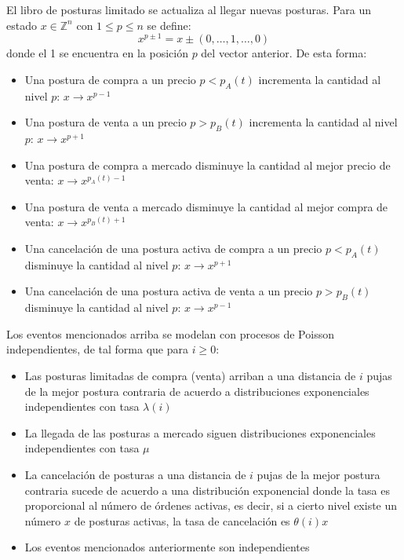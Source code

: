 \documentclass[11pt]{article}
\numberwithin{equation}{section} %
\begin{document}
El libro de posturas limitado se actualiza al llegar nuevas posturas. Para un estado $x \in \mathbb{Z}^n$ con $1\leq p \leq n$ se define:
\[
x^{p\pm 1}=x \pm (0,\ldots,1,\ldots,0)
\]
donde el 1 se encuentra en la posición $p$ del vector anterior. De esta forma:
\begin{itemize}
\item Una postura de compra a un precio $p<p_A(t)$ incrementa la cantidad al nivel $p$: $x\rightarrow x^{p-1}$
\item Una postura de venta a un precio $p>p_B(t)$ incrementa la cantidad al nivel $p$: $x\rightarrow x^{p+1}$
\item Una postura de compra a mercado disminuye la cantidad al mejor precio de venta: $x\rightarrow x^{p_A(t)-1}$
\item Una postura de venta a mercado disminuye la cantidad al mejor compra de venta: $x\rightarrow x^{p_B(t)+1}$
\item Una cancelación de una postura activa de compra a un precio $p<p_A(t)$ disminuye la cantidad al nivel $p$: $x\rightarrow x^{p+1}$
\item Una cancelación de una postura activa de venta a un precio $p>p_B(t)$ disminuye la cantidad al nivel $p$: $x\rightarrow x^{p-1}$\\
\end{itemize}

Los eventos mencionados arriba se modelan con procesos de Poisson independientes, de tal forma que para $i \geq 0$:
\begin{itemize}
\item Las posturas limitadas de compra (venta) arriban a una distancia de $i$ pujas de la mejor postura contraria de acuerdo a distribuciones exponenciales independientes con tasa $\lambda(i)$
\item La llegada de las posturas a mercado siguen distribuciones exponenciales independientes con tasa $\mu$
\item La cancelación de posturas a una distancia de $i$ pujas de la mejor postura contraria sucede de acuerdo a una distribución exponencial donde la tasa es proporcional al número de órdenes activas, es decir, si a cierto nivel existe un número $x$ de posturas activas, la tasa de cancelación es $\theta(i)x$
\item Los eventos mencionados anteriormente son independientes\\
\end{itemize}
\end{document}
